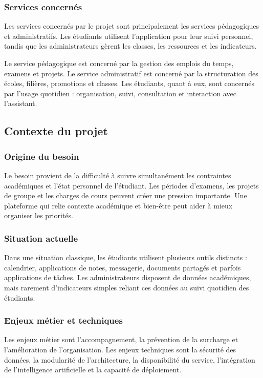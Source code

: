 \documentclass{rapportENSET}
\begin{document}
\subsubsection*{Services concernés}
Les services concernés par le projet sont principalement les services pédagogiques et administratifs. Les étudiants utilisent l'application pour leur suivi personnel, tandis que les administrateurs gèrent les classes, les ressources et les indicateurs.

Le service pédagogique est concerné par la gestion des emplois du temps, examens et projets. Le service administratif est concerné par la structuration des écoles, filières, promotions et classes. Les étudiants, quant à eux, sont concernés par l'usage quotidien : organisation, suivi, consultation et interaction avec l'assistant.

\subsection{Contexte du projet}
\subsubsection*{Origine du besoin}
Le besoin provient de la difficulté à suivre simultanément les contraintes académiques et l'état personnel de l'étudiant. Les périodes d'examens, les projets de groupe et les charges de cours peuvent créer une pression importante. Une plateforme qui relie contexte académique et bien-être peut aider à mieux organiser les priorités.

\subsubsection*{Situation actuelle}
Dans une situation classique, les étudiants utilisent plusieurs outils distincts : calendrier, applications de notes, messagerie, documents partagés et parfois applications de tâches. Les administrateurs disposent de données académiques, mais rarement d'indicateurs simples reliant ces données au suivi quotidien des étudiants.

\subsubsection*{Enjeux métier et techniques}
Les enjeux métier sont l'accompagnement, la prévention de la surcharge et l'amélioration de l'organisation. Les enjeux techniques sont la sécurité des données, la modularité de l'architecture, la disponibilité du service, l'intégration de l'intelligence artificielle et la capacité de déploiement.
\end{document}
